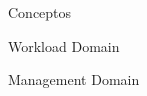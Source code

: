 \begin{section}{Conceptos}
\begin{subsection}{Workload Domain}
\begin{subsubsection}{Management Domain}

\end{subsubsection}


\end{subsection}
\end{section}
